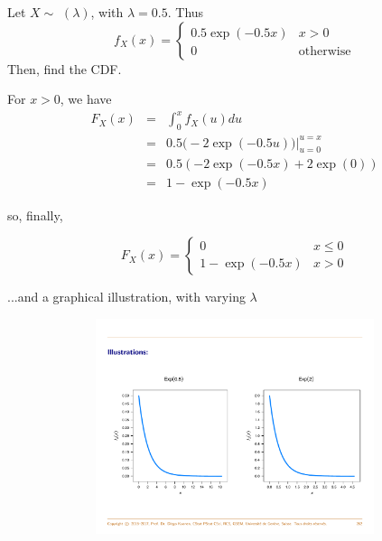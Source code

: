 \documentclass[smaller]{beamer}\usepackage[]{graphicx}\usepackage[]{color}
\begin{document}
\begin{frame}{\subsecname}
  \begin{small}
  \begin{example}
  Let $X\sim$ $(\lambda)$, with $\lambda =0.5$. Thus
  $$f_X(x) = \left\{ \begin{array}{ll}
  0.5 \exp (-0.5x) & x>0\\
  0 & \text{otherwise}
  \end{array} \right.$$
  Then, find the CDF.
  \medskip

  For $x>0$, we have
  \begin{eqnarray*}
  F_{X}(x) & = & \int_{0}^{x}f_{X}(u)du\\
  & = & 0.5\Big( -2\exp (-0.5u)\Big) \bigl|_{u=0}^{u=x}\\
  & = & 0.5(-2\exp (-0.5x)+2\exp (0))\\
  & = & 1-\exp (-0.5x)
  \end{eqnarray*}

  so, finally,

  $$F_X(x) = \left\{ \begin{array}{ll}
  0 & x \leq 0 \\
  1-\exp (-0.5x)& x>0
  \end{array} \right.$$
  \end{example}
  \end{small}
\end{frame}

\begin{frame}{\subsecname}
  \begin{example} [continued]

  ...and a graphical illustration, with varying $\lambda$

  \begin{figure}[ptb]\centering
  \includegraphics[height=2.4856in, width=4.5in]{img/Exp_Diego.pdf}%
  \end{figure}%

  \end{example}
\end{frame}
\end{document}

